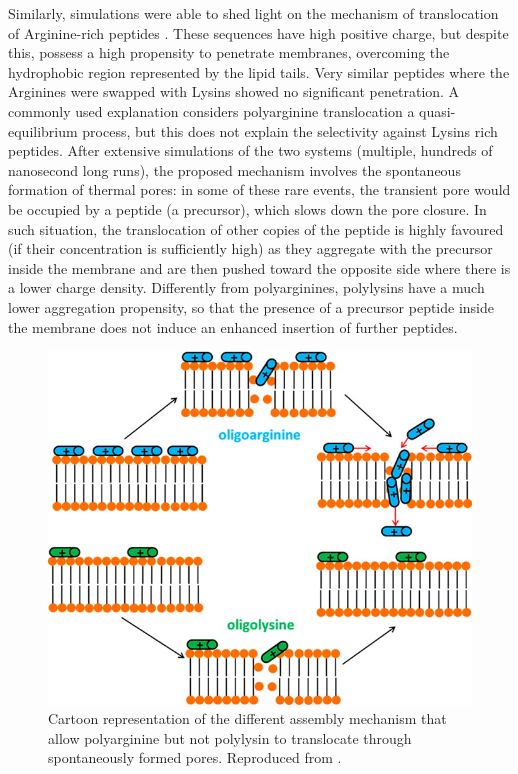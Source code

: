 Similarly, simulations were able to shed light on the mechanism of translocation of Arginine-rich peptides%
\citep{Sun2015}. These sequences have high positive charge, but despite this, possess a high propensity to penetrate membranes, overcoming the hydrophobic region represented by the lipid tails. Very similar peptides where the Arginines were swapped with Lysins showed no significant penetration.
%
A commonly used explanation considers polyarginine translocation a quasi-equilibrium process, but this does not explain the selectivity against Lysins rich peptides.
%
After extensive simulations of the two systems (multiple, hundreds of nanosecond long runs), the proposed mechanism involves the spontaneous formation of thermal pores: in some of these rare events, the transient pore would be occupied by a peptide (a precursor), which slows down the pore closure. In such situation, the translocation of other copies of the peptide is highly favoured (if their concentration is sufficiently high) as they aggregate with the precursor inside the membrane and are then pushed toward the opposite side where there is a lower charge density.
%
Differently from polyarginines, polylysins have a much lower aggregation propensity, so that the presence of a precursor peptide inside the membrane does not induce an enhanced insertion of further peptides.
%
\begin{figure}[t!]
\centering
\includegraphics[width=0.65\linewidth]{2methods/pics/polyarg.jpeg}
%
\caption[Polyarginine translocation]{Cartoon representation of the different assembly mechanism that allow polyarginine but not polylysin to translocate through spontaneously formed pores. Reproduced from \citet{Sun2015}.}
\label{fig:polyArg}
\end{figure}

